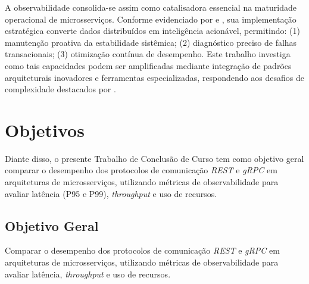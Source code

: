 A observabilidade consolida-se assim como catalisadora essencial na maturidade operacional de microsserviços. Conforme evidenciado por \cite{sandeep2022observability} e \cite{sha2023automating}, sua implementação estratégica converte dados distribuídos em inteligência acionável, permitindo: (1) manutenção proativa da estabilidade sistêmica; (2) diagnóstico preciso de falhas transacionais; (3) otimização contínua de desempenho. Este trabalho investiga como tais capacidades podem ser amplificadas mediante integração de padrões arquiteturais inovadores e ferramentas especializadas, respondendo aos desafios de complexidade destacados por \cite{shekhar2023microservices}.


\section{Objetivos}\label{sec:objetivos}

Diante disso, o presente Trabalho de Conclusão de Curso tem como objetivo geral comparar o desempenho dos protocolos de comunicação \textit{REST} e \textit{gRPC} em arquiteturas de microsserviços, utilizando métricas de observabilidade para avaliar latência (P95 e P99), \textit{throughput} e uso de recursos.

\subsection{Objetivo Geral}\label{subsec:objetivosgerais}

Comparar o desempenho dos protocolos de comunicação \textit{REST} e \textit{gRPC} em arquiteturas de microsserviços, utilizando métricas de observabilidade para avaliar latência, \textit{throughput} e uso de recursos.

